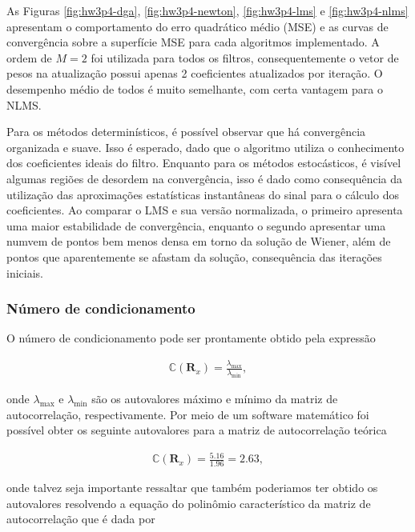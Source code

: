 As Figuras \ref{fig:hw3p4-dga}, \ref{fig:hw3p4-newton}, \ref{fig:hw3p4-lms} e \ref{fig:hw3p4-nlms} apresentam
o comportamento do erro quadrático médio (MSE) e as curvas de convergência sobre a superfície MSE para cada  algoritmos implementado. A ordem de $M = 2$ foi utilizada para todos os filtros, consequentemente o vetor de pesos na atualização possui apenas 2 coeficientes atualizados por iteração. O desempenho médio de todos é muito semelhante, com certa vantagem para o NLMS.

Para os métodos determinísticos, é possível observar que há convergência organizada e suave. Isso é esperado, dado que o algoritmo utiliza o conhecimento dos coeficientes ideais do filtro. Enquanto para os métodos estocásticos, é visível algumas regiões de desordem na convergência, isso é dado como consequência da utilização das aproximações estatísticas instantâneas do sinal para o cálculo dos coeficientes. Ao comparar o LMS e sua versão normalizada, o primeiro apresenta uma maior estabilidade de convergência, enquanto o segundo apresentar uma numvem de pontos bem menos densa em torno da solução de Wiener, além de pontos que aparentemente se afastam da solução, consequência das iterações iniciais.

\clearpage 


\subsubsection{Número de condicionamento}
    

        
        O número de condicionamento pode ser prontamente obtido pela expressão

        \begin{align}
            \mathbb{C} (\mathbf{R}_{x}) = \frac{\lambda_{\text{max}}}{\lambda_{\text{min}}},
        \end{align}
    
        onde $\lambda_{\text{max}}$ e $\lambda_{\text{min}}$ são os autovalores máximo e mínimo da matriz de autocorrelação, respectivamente. Por meio de um software
        matemático foi possível obter os seguinte autovalores para a matriz de autocorrelação teórica

        \begin{align}
            \mathbb{C} (\mathbf{R}_{x}) = \frac{5.16}{1.96} = 2.63,
        \end{align}

        onde talvez seja importante ressaltar que também poderiamos ter obtido os autovalores resolvendo a equação do polinômio
        característico da matriz de autocorrelação que é dada por

